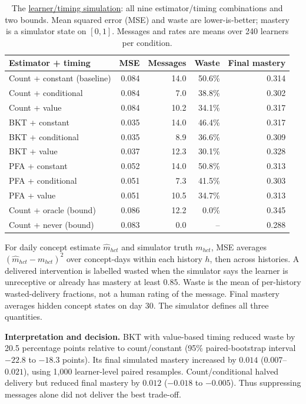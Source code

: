 \begin{table}[htbp]
\centering\small
\caption{The \hyperref[study-E]{learner/timing simulation}: all nine estimator/timing combinations and two bounds.
Mean squared error (MSE) and waste are lower-is-better; mastery is a simulator state on $[0,1]$.
Messages and rates are means over 240 learners per condition.}
\label{tab:learner-timing}
\begin{tabularx}{\linewidth}{@{}Yrrrr@{}}
\toprule Estimator + timing & MSE & Messages & Waste & Final mastery \\\midrule
Count + constant (baseline) & 0.084 & 14.0 & 50.6\% & 0.314 \\
Count + conditional & 0.084 & 7.0 & 38.8\% & 0.302 \\
Count + value & 0.084 & 10.2 & 34.1\% & 0.317 \\
BKT + constant & 0.035 & 14.0 & 46.4\% & 0.317 \\
BKT + conditional & 0.035 & 8.9 & 36.6\% & 0.309 \\
BKT + value & 0.037 & 12.3 & 30.1\% & 0.328 \\
PFA + constant & 0.052 & 14.0 & 50.8\% & 0.313 \\
PFA + conditional & 0.051 & 7.3 & 41.5\% & 0.303 \\
PFA + value & 0.051 & 10.5 & 34.7\% & 0.313 \\\midrule
Count + oracle (bound) & 0.086 & 12.2 & 0.0\% & 0.345 \\
Count + never (bound) & 0.083 & 0.0 & -- & 0.288 \\
\bottomrule
\end{tabularx}
\end{table}

For daily concept estimate $\hat m_{hct}$ and simulator truth $m_{hct}$,
MSE averages $(\hat m_{hct}-m_{hct})^2$ over concept-days within each history
$h$, then across histories. A delivered intervention is labelled wasted when
the simulator says the learner is unreceptive or already has mastery at least
$0.85$. Waste is the mean of per-history wasted-delivery fractions, not a
human rating of the message. Final mastery averages hidden concept states on
day 30. The simulator defines all three quantities.

\begin{samepage}
\textbf{Interpretation and decision.}
BKT with value-based timing reduced waste by 20.5 percentage points relative
to count/constant (95\% paired-bootstrap interval $-22.8$ to $-18.3$ points).
Its final simulated mastery increased by $0.014$ ($0.007$--$0.021$), using
1,000 learner-level paired resamples. Count/conditional halved delivery but
reduced final mastery by $0.012$ ($-0.018$ to $-0.005$). Thus suppressing
messages alone did not deliver the best trade-off.
\end{samepage}

